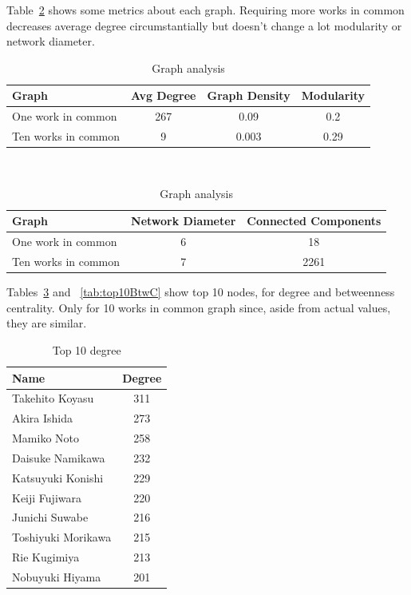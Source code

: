 Table~\ref{tab:graphComparision} shows some metrics about each graph. Requiring more works in common decreases average degree circumstantially but doesn't change a lot modularity or network diameter.
\begin{table}[!hbt]
	\begin{center}
	\caption{Graph analysis}
	\label{tab:graphComparision}
	\begin{tabular}{|l|c|c|c|}
		\hline
		Graph & Avg Degree & Graph Density & Modularity \\
		\hline
		One work in common & 267 & 0.09 & 0.2 \\
		\hline
		Ten works in common & 9 & 0.003 & 0.29 \\
		\hline
	\end{tabular}\\
	\smallskip
	\begin{tabular}{|l|c|c|}
		\hline
		Graph & Network Diameter & Connected Components \\
		\hline
		One work in common & 6 & 18 \\
		\hline
		Ten works in common & 7 & 2261 \\
		\hline
	\end{tabular}
	\end{center}
\end{table}

Tables~\ref{tab:top10Degree} and ~\ref{tab:top10BtwC} show top 10 nodes, for degree and betweenness centrality. Only for 10 works in common graph since, aside from actual values, they are similar. 
\begin{table}[!hbt]
	\begin{center}
	\caption{Top 10 degree}
	\label{tab:top10Degree}
	\begin{tabular}{|l|c|}
		\hline
		Name & Degree\\ 
		\hline
		Takehito Koyasu & 311 \\ 
		\hline
		Akira Ishida & 273\\ 
		\hline
		Mamiko Noto & 258\\ 
		\hline
		Daisuke Namikawa & 232 \\ 
		\hline
		Katsuyuki Konishi & 229 \\ 
		\hline
		Keiji Fujiwara & 220 \\ 
		\hline
		Junichi Suwabe & 216 \\ 
		\hline
		Toshiyuki Morikawa & 215 \\ 
		\hline
		Rie Kugimiya & 213 \\ 
		\hline
		Nobuyuki Hiyama & 201 \\ 
		\hline
	\end{tabular}
	\end{center}
\end{table}

